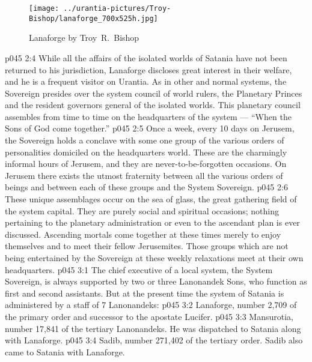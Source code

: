 \begin{figure}[H]
\centering
\texttt{[image: ../urantia-pictures/Troy-Bishop/lanaforge\_700x525h.jpg]}
\caption{Lanaforge by Troy~R.~Bishop}
\end{figure}
\vs p045 2:4 \pc While all the affairs of the isolated worlds of Satania have not been returned to his jurisdiction, Lanaforge discloses great interest in their welfare, and he is a frequent visitor on Urantia. As in other and normal systems, the Sovereign presides over the system council of world rulers, the Planetary Princes and the resident governors general of the isolated worlds. This planetary council assembles from time to time on the headquarters of the system --- “When the Sons of God come together.”
\vs p045 2:5 Once a week, every 10 days on Jerusem, the Sovereign holds a conclave with some one group of the various orders of personalities domiciled on the headquarters world. These are the charmingly informal hours of Jerusem, and they are never\hyp{}to\hyp{}be\hyp{}forgotten occasions. On Jerusem there exists the utmost fraternity between all the various orders of beings and between each of these groups and the System Sovereign.
\vs p045 2:6 These unique assemblages occur on the sea of glass, the great gathering field of the system capital. They are purely social and spiritual occasions; nothing pertaining to the planetary administration or even to the ascendant plan is ever discussed. Ascending mortals come together at these times merely to enjoy themselves and to meet their fellow Jerusemites. Those groups which are not being entertained by the Sovereign at these weekly relaxations meet at their own headquarters.
\vs p045 3:1 The chief executive of a local system, the System Sovereign, is always supported by two or three Lanonandek Sons, who function as first and second assistants. But at the present time the system of Satania is administered by a staff of 7 Lanonandeks:
\vs p045 3:2 \bibnobreakspace {} Lanaforge, number 2,709 of the primary order and successor to the apostate Lucifer.
\vs p045 3:3 \bibnobreakspace {} Mansurotia, number 17,841 of the tertiary Lanonandeks. He was dispatched to Satania along with Lanaforge.
\vs p045 3:4 \bibnobreakspace {} Sadib, number 271,402 of the tertiary order. Sadib also came to Satania with Lanaforge.
